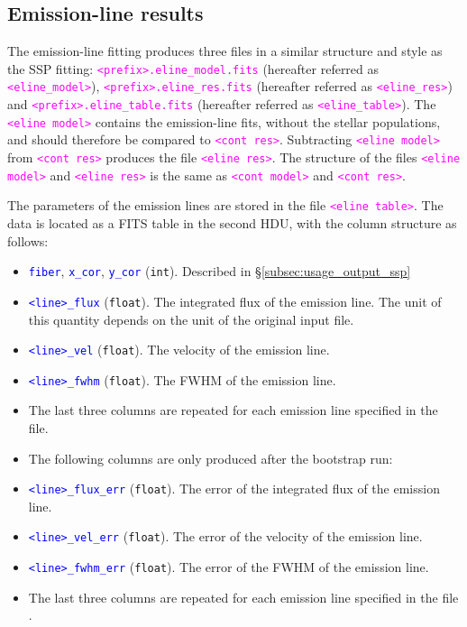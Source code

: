 \documentclass[usenatbib,usegraphicx,useAMS,onecolumn]{mn2e}
\newcommand{\codeline}[1]{\lstinline|#1|}
\newcommand{\tblcol}[1]{\textcolor{blue}{\codeline{#1}}}
\newcommand{\fname}[1]{\textcolor{magenta}{\codeline{#1}}}
\begin{document}
\subsection{Emission-line results}
\label{subsec:usage_output_line}
The emission-line fitting produces three files in a similar structure and style as the SSP fitting: \fname{<prefix>.eline_model.fits} (hereafter referred as \fname{<eline_model>}), \fname{<prefix>.eline_res.fits} (hereafter referred as \fname{<eline_res>}) and \fname{<prefix>.eline_table.fits} (hereafter referred as \fname{<eline_table>}).
The \fname{<eline model>} contains the emission-line fits, without the stellar populations, and should therefore be compared to \fname{<cont res>}.
Subtracting \fname{<eline model>} from \fname{<cont res>} produces the file \fname{<eline res>}.
The structure of the files \fname{<eline model>} and \fname{<eline res>} is the same as \fname{<cont model>} and \fname{<cont res>}.

The parameters of the emission lines are stored in the file \fname{<eline table>}.
The data is located as a FITS table in the second HDU, with the column structure as follows:
\begin{itemize}
    \item \tblcol{fiber}, \tblcol{x_cor}, \tblcol{y_cor} (\texttt{int}).
        Described in \S\ref{subsec:usage_output_ssp}
    \item \tblcol{<line>_flux} (\texttt{float}).
        The integrated flux of the emission line.
        The unit of this quantity depends on the unit of the original input file.
    \item \tblcol{<line>_vel} (\texttt{float}).
        The velocity of the emission line.
    \item \tblcol{<line>_fwhm} (\texttt{float}).
        The FWHM of the emission line.
    \item[] The last three columns are repeated for each emission line specified in the file.
    \item[] The following columns are only produced after the bootstrap run:
    \item \tblcol{<line>_flux_err} (\texttt{float}).
        The error of the integrated flux of the emission line.
    \item \tblcol{<line>_vel_err} (\texttt{float}).
        The error of the velocity of the emission line.
    \item \tblcol{<line>_fwhm_err} (\texttt{float}).
        The error of the FWHM of the emission line.
    \item[] The last three columns are repeated for each emission line specified in the file .
\end{itemize}
\end{document}
